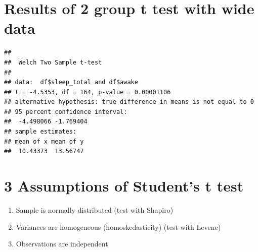 \documentclass[
]{book}
\newenvironment{Shaded}{\begin{snugshade}}{\end{snugshade}}
\newcommand{\DataTypeTok}[1]{\textcolor[rgb]{0.13,0.29,0.53}{#1}}
\newcommand{\KeywordTok}[1]{\textcolor[rgb]{0.13,0.29,0.53}{\textbf{#1}}}
\newcommand{\NormalTok}[1]{#1}
\newcommand{\OperatorTok}[1]{\textcolor[rgb]{0.81,0.36,0.00}{\textbf{#1}}}
\providecommand{\tightlist}{%
  \setlength{\itemsep}{0pt}\setlength{\parskip}{0pt}}
\begin{document}
\begin{Shaded}
\end{Shaded}

\hypertarget{results-of-2-group-t-test-with-wide-data}{%
\section{Results of 2 group t test with wide data}\label{results-of-2-group-t-test-with-wide-data}}

\begin{Shaded}
\end{Shaded}

\begin{verbatim}
## 
##  Welch Two Sample t-test
## 
## data:  df$sleep_total and df$awake
## t = -4.5353, df = 164, p-value = 0.00001106
## alternative hypothesis: true difference in means is not equal to 0
## 95 percent confidence interval:
##  -4.498066 -1.769404
## sample estimates:
## mean of x mean of y 
##  10.43373  13.56747
\end{verbatim}

\hypertarget{assumptions-of-students-t-test}{%
\section{3 Assumptions of Student's t test}\label{assumptions-of-students-t-test}}

\begin{enumerate}
\def\labelenumi{\arabic{enumi}.}
\tightlist
\item
  Sample is normally distributed (test with Shapiro)
\item
  Variances are homogeneous (homoskedasticity) (test with Levene)
\item
  Observations are independent
\end{enumerate}
\end{document}
